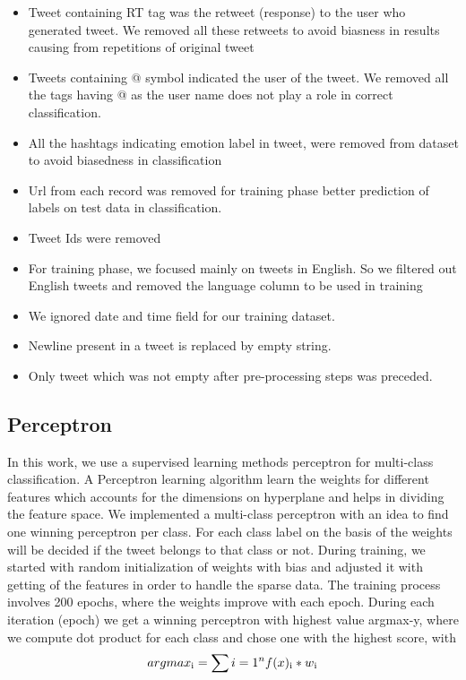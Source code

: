 \documentclass[11pt]{article}
\begin{document}
\begin{itemize}
\item Tweet containing RT tag was the retweet (response) to the user who generated tweet. We removed all these retweets to avoid biasness in results causing from repetitions of original tweet
\item Tweets containing @ symbol indicated the user of the tweet. We removed all the tags having @ as the user name does not play a role in correct classification.
\item All the hashtags indicating emotion label in tweet, were removed from dataset to avoid biasedness in classification
\item	Url from each record was removed for training phase better prediction of labels on test data in classification. 
\item	Tweet Ids were removed
\item	For training phase, we focused mainly on tweets in English. So we filtered out English tweets and removed the language column to be used in training
\item	We ignored date and time field for our training dataset.
\item 	Newline present in a tweet is replaced by empty string.
\item 	Only tweet which was not empty after pre-processing steps was preceded.
\end{itemize}


\subsection{Perceptron}

In this work, we use a supervised learning methods perceptron for multi-class classification. A Perceptron learning algorithm learn the weights for different features which accounts for the dimensions on hyperplane and helps in dividing the feature space. We implemented a multi-class perceptron with an idea to find one winning perceptron per class.
	For each class label on the basis of the weights will be decided if the tweet belongs to that class or not. During training, we started with random initialization of weights with bias and adjusted it with getting of the features in order to handle the sparse data. The training process involves 200 epochs, where the weights improve with each epoch. During each iteration (epoch) we get a winning perceptron with highest value argmax-y, where we compute dot product for each class and chose one with the highest score, with
	{$$arg max\textsubscript{i} = \sum\limits {i=1}^n f(x)\textsubscript{i} * w\textsubscript{i}$$}
\end{document}
